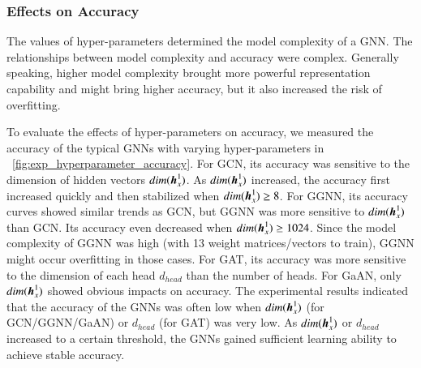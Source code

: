 \subsubsection{Effects on Accuracy}

%
The values of hyper-parameters determined the model complexity of a GNN.
%
The relationships between model complexity and accuracy were complex.
%
%
Generally speaking, higher model complexity brought more powerful representation capability and might bring higher accuracy, but it also increased the risk of overfitting.

To evaluate the effects of hyper-parameters on accuracy, we measured the accuracy of the typical GNNs with varying hyper-parameters in \figurename~\ref{fig:exp_hyperparameter_accuracy}.
%
For GCN, its accuracy was sensitive to the dimension of hidden vectors $dim(\boldsymbol{h}^1_x)$.
%
As $dim(\boldsymbol{h}^1_x)$ increased, the accuracy first increased quickly and then stabilized when $dim(\boldsymbol{h}_x^1) \geq 8$.
%
For GGNN, its accuracy curves showed similar trends as GCN, but GGNN was more sensitive to $dim(\boldsymbol{h}_x^1)$ than GCN.
%
Its accuracy even decreased when $dim(\boldsymbol{h}_x^1) \geq 1024$.
%
Since the model complexity of GGNN was high (with 13 weight matrices/vectors to train), GGNN might occur overfitting in those cases.
%
For GAT, its accuracy was more sensitive to the dimension of each head $d_{head}$ than the number of heads.
%
For GaAN, only $dim(\boldsymbol{h}_x^1)$ showed obvious impacts on accuracy.
%
The experimental results indicated that the accuracy of the GNNs was often low when $dim(\boldsymbol{h}_x^1)$ (for GCN/GGNN/GaAN) or $d_{head}$ (for GAT) was very low.
%
%
As $dim(\boldsymbol{h}_x^1)$ or $d_{head}$ increased to a certain threshold, the GNNs gained sufficient learning ability to achieve stable accuracy.

